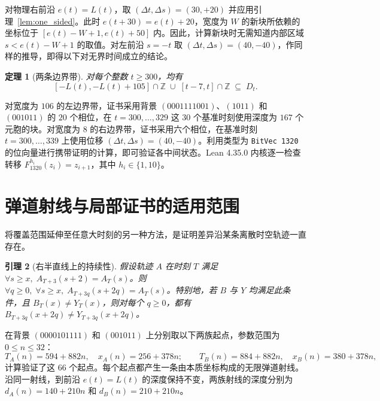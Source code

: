 \documentclass[11pt, a4paper]{article}
\newtheorem{theorem}{定理}[section]
\newtheorem{lemma}[theorem]{引理}
\begin{document}
对物理右前沿 $e(t) = L(t)$，取 $(\Delta t, \Delta s) = (30, +20)$ 并应用引理~\ref{lem:one_sided}。此时 $e(t+30) = e(t) + 20$，宽度为 $W$ 的新块所依赖的坐标位于 $[e(t) - W + 1, e(t) + 50]$ 内。因此，计算新块时无需知道内部区域 $s < e(t) - W + 1$ 的取值。对左前沿 $s = -t$ 取 $(\Delta t, \Delta s) = (40,-40)$，作同样的推导，即得以下对无界时间成立的结论。

\begin{theorem}[两条边界带]\label{thm:dual_strips}
对每个整数 $t \ge 300$，均有
\begin{equation}\label{eq:dual_strips}
[-L(t), -L(t) + 105] \cap \mathbb{Z} \;\cup\; [t - 7, t] \cap \mathbb{Z} \;\subseteq\; D_t.
\end{equation}
\end{theorem}

对宽度为 $106$ 的左边界带，证书采用背景 $(0001111001)$、$(1011)$ 和 $(001011)$ 的 $20$ 个相位，在 $t = 300, \dots, 329$ 这 $30$ 个基准时刻使用深度为 $167$ 个元胞的块。对宽度为 $8$ 的右边界带，证书采用六个相位，在基准时刻 $t = 300, \dots, 339$ 上使用位移 $(\Delta t, \Delta s) = (40,-40)$。利用类型为 \texttt{BitVec 1320} 的位向量进行携带证明的计算，即可验证各中间状态。Lean 4.35.0 内核逐一检查转移 $F_{1320}^{h_i}(z_i) = z_{i+1}$，其中 $h_i \in \{1, 10\}$。

\section{弹道射线与局部证书的适用范围}

将覆盖范围延伸至任意大时刻的另一种方法，是证明差异沿某条离散时空轨迹一直存在。

\begin{lemma}[右半直线上的持续性]\label{lem:ballistic_ray}
假设轨迹 $A$ 在时刻 $T$ 满足 $\forall s \ge x,\; A_{T+3}(s + 2) = A_T(s)$。则 $\forall q \ge 0,\; \forall s \ge x,\; A_{T+3q}(s + 2q) = A_T(s)$。特别地，若 $B$ 与 $Y$ 均满足此条件，且 $B_T(x) \ne Y_T(x)$，则对每个 $q \ge 0$，都有 $B_{T+3q}(x + 2q) \ne Y_{T+3q}(x + 2q)$。
\end{lemma}

在背景 $(0000101111)$ 和 $(001011)$ 上分别取以下两族起点，参数范围为 $0 \le n \le 32$：
\begin{equation}
T_A(n) = 594 + 882n,\quad x_A(n) = 256 + 378n; \qquad
T_B(n) = 884 + 882n,\quad x_B(n) = 380 + 378n,
\end{equation}
计算验证了这 $66$ 个起点。每个起点都产生一条由本质坐标构成的无限弹道射线。沿同一射线，到前沿 $e(t) = L(t)$ 的深度保持不变，两族射线的深度分别为 $d_A(n) = 140 + 210n$ 和 $d_B(n) = 210 + 210n$。
\end{document}
